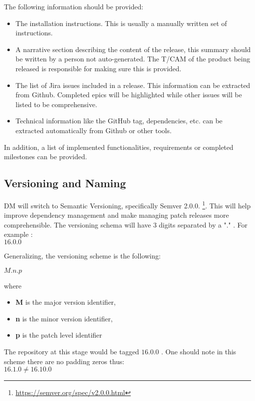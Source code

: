 The following information should be provided:
\begin{itemize}
\item The installation instructions. This is usually a manually written set of instructions. 
\item A narrative section describing the content of the release, this summary should be written by a person not auto-generated.
The T/CAM of the product being released is responsible for making sure this is provided.
\item The list of Jira issues included in a release. This information can be extracted from Github. 
Completed epics will be highlighted while other issues will be listed to be comprehensive.
\item Technical information like the GitHub tag, dependencies, etc. can be extracted automatically from Github or other tools.
\end{itemize}

In addition, a list of implemented functionalities, requirements or completed milestones can be provided.

\subsection{Versioning and Naming} \label{sec:versioning}

DM will  switch to Semantic Versioning, specifically Semver 2.0.0. \footnote{\url{https://semver.org/spec/v2.0.0.html}}.
This will help improve dependency management and make managing patch releases more comprehensible.
The versioning schema will have 3 digits separated by a "." . For example :
\\
$16.0.0$

Generalizing, the versioning scheme is the following:

$M.n.p$

where

\begin{itemize}
\item \textbf{M} is the major version identifier,
\item \textbf{n} is the minor version identifier,
\item \textbf{p} is the patch level identifier
\end{itemize}

The repository at this stage would be tagged $16.0.0$ .
One should note in this scheme there are no padding zeros thus:
\\
$16.1.0   \neq 16.10.0$

